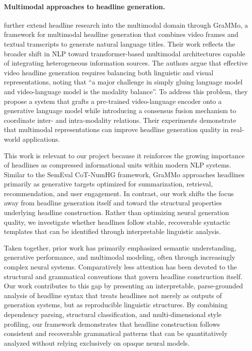 \documentclass[11pt]{article}
\begin{document}
\paragraph{Multimodal approaches to headline generation.} \citet{qiao-etal-2022-grafting} further extend headline research into the multimodal domain through GraMMo, a framework for multimodal headline generation that combines video frames and textual transcripts to generate natural language titles. Their work reflects the broader shift in NLP toward transformer-based multimodal architectures capable of integrating heterogeneous information sources. The authors argue that effective video headline generation requires balancing both linguistic and visual representations, noting that ``a major challenge in simply gluing language model and video-language model is the modality balance''. To address this problem, they propose a system that grafts a pre-trained video-language encoder onto a generative language model while introducing a consensus fusion mechanism to coordinate inter- and intra-modality relations. Their experiments demonstrate that multimodal representations can improve headline generation quality in real-world applications.

This work is relevant to our project because it reinforces the growing importance of headlines as compressed informational units within modern NLP systems. Similar to the SemEval CoT-NumHG framework, GraMMo approaches headlines primarily as generative targets optimized for summarization, retrieval, recommendation, and user engagement. In contrast, our work shifts the focus away from headline generation itself and toward the structural properties underlying headline construction. Rather than optimizing neural generation quality, we investigate whether headlines follow stable, recoverable syntactic templates that can be identified through interpretable linguistic analysis.

Taken together, prior work has primarily emphasized semantic understanding, generative performance, and multimodal modeling, often through increasingly complex neural systems. Comparatively less attention has been devoted to the structural and grammatical conventions that govern headline construction itself. Our work contributes to this gap by presenting an interpretable, parse-grounded analysis of headline syntax that treats headlines not merely as outputs of generation systems, but as reproducible linguistic structures. By combining dependency parsing, structural classification, and multi-dimensional style profiling, our framework demonstrates that headline construction follows consistent and recoverable grammatical patterns that can be quantitatively analyzed without relying exclusively on opaque neural models.
\end{document}

